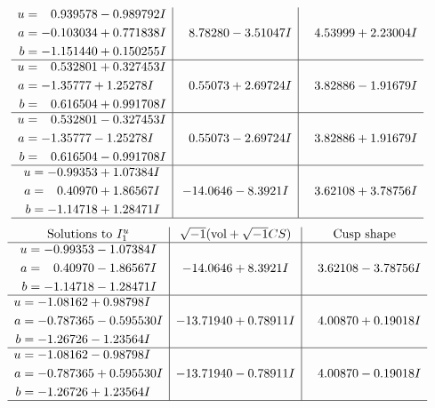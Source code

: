 \documentclass[1p]{elsarticle_modified}
\theoremstyle{definition}
\newcommand{\I}{\sqrt{-1}}
\begin{document}
$$\begin{array}{c|c|c}
\begin{aligned}
u &= \phantom{-}0.939578 - 0.989792 I \\
a &= -0.103034 + 0.771838 I \\
b &= -1.151440 + 0.150255 I\end{aligned}
 & \phantom{-}8.78280 - 3.51047 I & \phantom{-}4.53999 + 2.23004 I \\ \hline\begin{aligned}
u &= \phantom{-}0.532801 + 0.327453 I \\
a &= -1.35777 + 1.25278 I \\
b &= \phantom{-}0.616504 + 0.991708 I\end{aligned}
 & \phantom{-}0.55073 + 2.69724 I & \phantom{-}3.82886 - 1.91679 I \\ \hline\begin{aligned}
u &= \phantom{-}0.532801 - 0.327453 I \\
a &= -1.35777 - 1.25278 I \\
b &= \phantom{-}0.616504 - 0.991708 I\end{aligned}
 & \phantom{-}0.55073 - 2.69724 I & \phantom{-}3.82886 + 1.91679 I \\ \hline\begin{aligned}
u &= -0.99353 + 1.07384 I \\
a &= \phantom{-}0.40970 + 1.86567 I \\
b &= -1.14718 + 1.28471 I\end{aligned}
 & -14.0646 - 8.3921 I & \phantom{-}3.62108 + 3.78756 I\\
 \hline 
 \end{array}$$\newpage$$\begin{array}{c|c|c}  
\text{Solutions to }I^u_{1}& \I (\text{vol} + \sqrt{-1}CS) & \text{Cusp shape}\\
 \hline 
\begin{aligned}
u &= -0.99353 - 1.07384 I \\
a &= \phantom{-}0.40970 - 1.86567 I \\
b &= -1.14718 - 1.28471 I\end{aligned}
 & -14.0646 + 8.3921 I & \phantom{-}3.62108 - 3.78756 I \\ \hline\begin{aligned}
u &= -1.08162 + 0.98798 I \\
a &= -0.787365 - 0.595530 I \\
b &= -1.26726 - 1.23564 I\end{aligned}
 & -13.71940 + 0.78911 I & \phantom{-}4.00870 + 0.19018 I \\ \hline\begin{aligned}
u &= -1.08162 - 0.98798 I \\
a &= -0.787365 + 0.595530 I \\
b &= -1.26726 + 1.23564 I\end{aligned}
 & -13.71940 - 0.78911 I & \phantom{-}4.00870 - 0.19018 I\\
 \hline 
 \end{array}$$\newpage\newpage\renewcommand{\arraystretch}{1}
\end{document}
